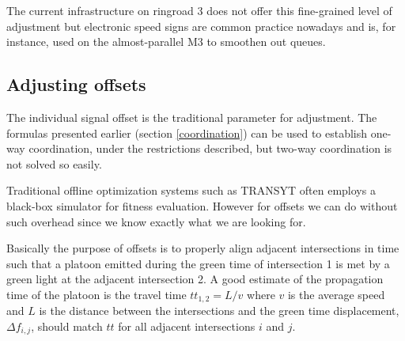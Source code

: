 The current infrastructure on ringroad 3 does not offer this fine-grained level of adjustment but electronic speed signs are common practice nowadays and is, for instance, used on the almost-parallel M3 to smoothen out queues.

\subsection{Adjusting offsets}
The individual signal offset is the traditional parameter for adjustment. The formulas presented earlier (section \ref{coordination}) can be used to establish one-way coordination, under the restrictions described, but two-way coordination is not solved so easily.

Traditional offline optimization systems such as TRANSYT often employs a black-box simulator for fitness evaluation. However for offsets we can do without such overhead since we know exactly what we are looking for.

Basically the purpose of offsets is to properly align adjacent intersections in time such that a platoon emitted during the green time of intersection 1 is met by a green light at the adjacent intersection 2. A good estimate of the propagation time of the platoon is the travel time $tt_{1,2} = L / v$ where $v$ is the average speed and $L$ is the distance between the intersections and the green time displacement, $\Delta f_{i,j}$, should match $tt$ for all adjacent intersections $i$ and $j$.

